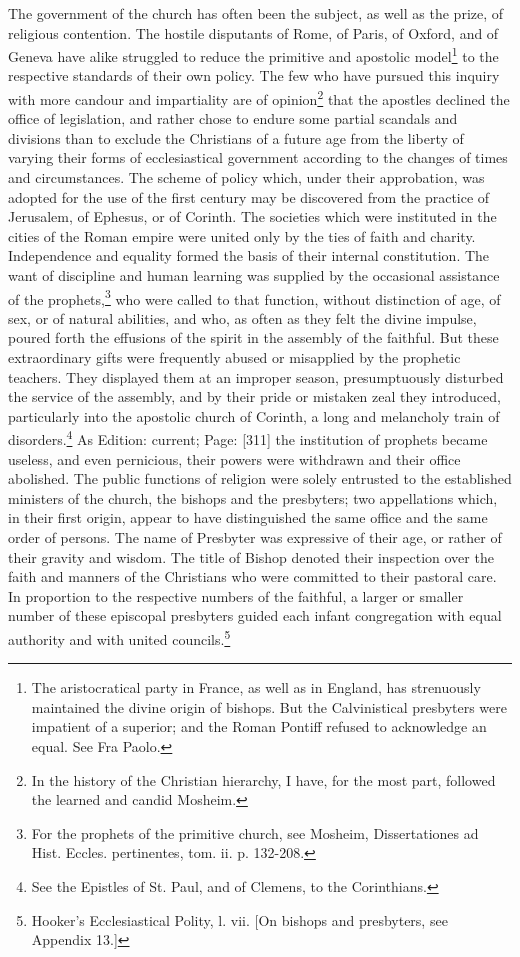 The government of the church has often been the subject, as well as the prize, of religious contention. The hostile disputants of Rome, of Paris, of Oxford, and of Geneva have alike struggled to reduce the primitive and apostolic model\footnote{The aristocratical party in France, as well as in England, has strenuously maintained the divine origin of bishops. But the Calvinistical presbyters were impatient of a superior; and the Roman Pontiff refused to acknowledge an equal. See Fra Paolo.} to the respective standards of their own policy. The few who have pursued this inquiry with more candour and impartiality are of opinion\footnote{In the history of the Christian hierarchy, I have, for the most part, followed the learned and candid Mosheim.} that the apostles declined the office of legislation, and rather chose to endure some partial scandals and divisions than to exclude the Christians of a future age from the liberty of varying their forms of ecclesiastical government according to the changes of times and circumstances. The scheme of policy which, under their approbation, was adopted for the use of the first century may be discovered from the practice of Jerusalem, of Ephesus, or of Corinth. The societies which were instituted in the cities of the Roman empire were united only by the ties of faith and charity. Independence and equality formed the basis of their internal constitution. The want of discipline and human learning was supplied by the occasional assistance of the prophets,\footnote{For the prophets of the primitive church, see Mosheim, Dissertationes ad Hist. Eccles. pertinentes, tom. ii. p. 132-208.} who were called to that function, without distinction of age, of sex, or of natural abilities, and who, as often as they felt the divine impulse, poured forth the effusions of the spirit in the assembly of the faithful. But these extraordinary gifts were frequently abused or misapplied by the prophetic teachers. They displayed them at an improper season, presumptuously disturbed the service of the assembly, and by their pride or mistaken zeal they introduced, particularly into the apostolic church of Corinth, a long and melancholy train of disorders.\footnote{See the Epistles of St. Paul, and of Clemens, to the Corinthians.} As Edition: current; Page: [311] the institution of prophets became useless, and even pernicious, their powers were withdrawn and their office abolished. The public functions of religion were solely entrusted to the established ministers of the church, the bishops and the presbyters; two appellations which, in their first origin, appear to have distinguished the same office and the same order of persons. The name of Presbyter was expressive of their age, or rather of their gravity and wisdom. The title of Bishop denoted their inspection over the faith and manners of the Christians who were committed to their pastoral care. In proportion to the respective numbers of the faithful, a larger or smaller number of these episcopal presbyters guided each infant congregation with equal authority and with united councils.\footnote{Hooker\texthebrew{}’s Ecclesiastical Polity, l. vii. [On bishops and presbyters, see Appendix 13.]}

